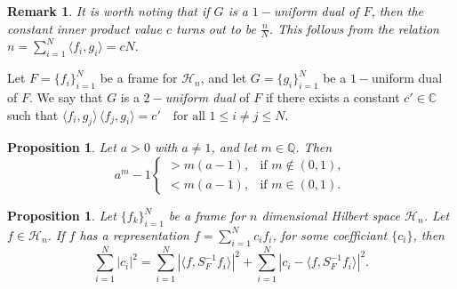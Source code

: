 \documentclass[final,1p,times]{elsarticle}
\newtheorem{rem}[thm]{Remark}
\newtheorem{prop}[thm]{Proposition}
\begin{document}
\begin{rem}\label{rem3point2}
	It is worth noting that if $G$ is a $1-$uniform dual of $F$, then the constant inner product value $c$ turns out to be $\frac{n}{N}$. This follows from the relation $n = \sum_{i=1}^N \langle f_i, g_i \rangle = cN.$
\end{rem}


	\begin{defn}
Let \( F = \{f_i\}_{i=1}^N \) be a frame for \( \mathcal{H}_n \), and let \( G = \{g_i\}_{i=1}^N \) be a \(1-\)uniform dual of \( F \). 
We say that \( G \) is a \emph{\(2-\)uniform dual} of \( F \) if there exists a constant \( c' \in \mathbb{C} \) such that $\langle f_i, g_j \rangle \, \langle f_j, g_i \rangle = c'\quad \text{for all } 1 \leq i \neq j \leq N.$
\end{defn}
\vspace{0.5cm}

\begin{prop}\label{thm2point4minq}\cite{mapa}
Let \( a > 0 \) with \( a \neq 1 \), and let \( m \in \mathbb{Q} \). Then
\[
a^m - 1 
\begin{cases}
> m(a-1), & \text{if } m \notin (0,1), \\[6pt]
< m(a-1), & \text{if } m \in (0,1).
\end{cases}
\]
\end{prop}


 \begin{prop}\cite{ole} \label{olethm1}
  Let $\{f_k \}_{i=1}^N$ be a frame for $n$ dimensional Hilbert space $\mathcal{H}_n$. Let $ f \in \mathcal{H}_n$. If $f$ has a representation $ f = \sum\limits_{i=1}^N c_i f_i$, for some coefficiant $\{c_i\}$, then \\
  \begin{equation} \label{oleeqn}
     \sum_{i=1}^N |c_i|^2 = \sum_{i=1}^N |\langle f, S_F^{-1}f_i \rangle |^2 + \sum_{i=1}^N |c_i - \langle f, S_F^{-1}f_i \rangle |^2  .
       \end{equation}  
  
  \end{prop}
  
\end{document}
